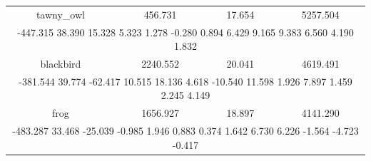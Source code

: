 \documentclass{article}
\begin{document}
\begin{tabular}{|c|c|c|c|}
tawny\_owl & 456.731 & 17.654 & 5257.504 \\\multicolumn{4}{|c|}{-447.315 38.390 15.328 5.323 1.278 -0.280 0.894 6.429 9.165 9.383 6.560 4.190 1.832 } \\ \hline
blackbird & 2240.552 & 20.041 & 4619.491 \\\multicolumn{4}{|c|}{-381.544 39.774 -62.417 10.515 18.136 4.618 -10.540 11.598 1.926 7.897 1.459 2.245 4.149 } \\ \hline
frog & 1656.927 & 18.897 & 4141.290 \\\multicolumn{4}{|c|}{-483.287 33.468 -25.039 -0.985 1.946 0.883 0.374 1.642 6.730 6.226 -1.564 -4.723 -0.417 } \\ \hline
\end{tabular}
\end{document}
